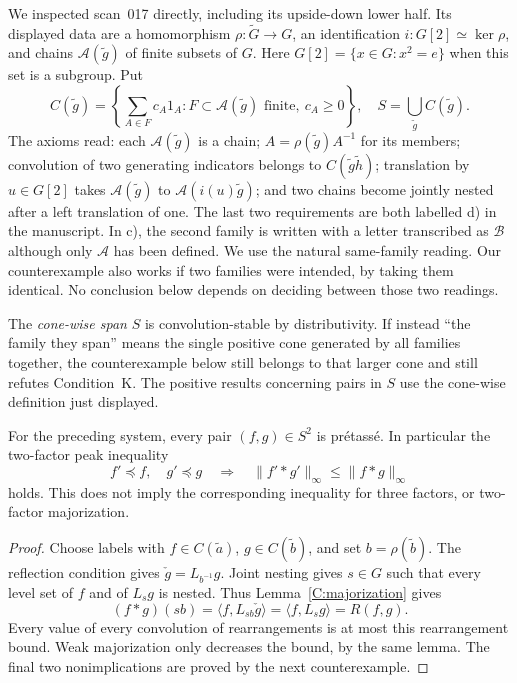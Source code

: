 We inspected scan~017 directly, including its upside-down lower half. Its displayed data are a homomorphism $\rho:\widetilde G\to G$, an identification $i:G[2]\simeq\ker\rho$, and chains $\mathcal A(\tilde g)$ of finite subsets of $G$. Here $G[2]=\{x\in G:x^2=e\}$ when this set is a subgroup. Put
\[
C(\tilde g)=\left\{\sum_{A\in F}c_A1_A:
 F\subset\mathcal A(\tilde g)\text{ finite},\ c_A\geq0\right\},
\quad S=\bigcup_{\tilde g}C(\tilde g).
\]
The axioms read: each $\mathcal A(\tilde g)$ is a chain; $A=\rho(\tilde g)A^{-1}$ for its members; convolution of two generating indicators belongs to $C(\tilde g\tilde h)$; translation by $u\in G[2]$ takes $\mathcal A(\tilde g)$ to $\mathcal A(i(u)\tilde g)$; and two chains become jointly nested after a left translation of one. The last two requirements are both labelled d) in the manuscript. In c), the second family is written with a letter transcribed as $\mathcal B$ although only $\mathcal A$ has been defined. We use the natural same-family reading. Our counterexample also works if two families were intended, by taking them identical. No conclusion below depends on deciding between those two readings.

The \emph{cone-wise span} $S$ is convolution-stable by distributivity. If instead ``the family they span'' means the single positive cone generated by all families together, the counterexample below still belongs to that larger cone and still refutes Condition~K. The positive results concerning pairs in $S$ use the cone-wise definition just displayed.

\begin{theorem}
\label{C:pretasse-cones}
For the preceding system, every pair $(f,g)\in S^2$ is pr\'etass\'e. In particular the two-factor peak inequality
\[
f'\preceq f,\quad g'\preceq g
\quad\Longrightarrow\quad
\|f'*g'\|_\infty\leq\|f*g\|_\infty
\]
holds. This does not imply the corresponding inequality for three factors, or two-factor majorization.
\end{theorem}
\begin{proof}
Choose labels with $f\in C(\tilde a)$, $g\in C(\tilde b)$, and set $b=\rho(\tilde b)$. The reflection condition gives $\check g=L_{b^{-1}}g$. Joint nesting gives $s\in G$ such that every level set of $f$ and of $L_sg$ is nested. Thus Lemma~\ref{C:majorization} gives
\[
(f*g)(sb)=\langle f,L_{sb}\check g\rangle
 =\langle f,L_sg\rangle=R(f,g).
\]
Every value of every convolution of rearrangements is at most this rearrangement bound. Weak majorization only decreases the bound, by the same lemma. The final two nonimplications are proved by the next counterexample.
\end{proof}

